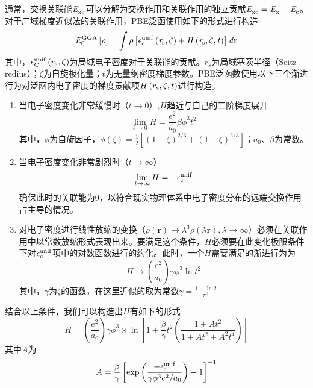 通常，交换关联能$\it E_{\rm xc}^{\rm } \it$可以分解为交换作用和关联作用的独立贡献\chinesecolon $\it E_{\rm xc}^{\rm } \it=\it E_{\rm x}^{\rm } \it+\it E_{\rm c}^{\rm } \it$。对于广域梯度近似法的关联作用，PBE泛函使用如下的形式进行构造\chinesecolon
\begin{equation}
    \it E_{\rm C}^{\rm GGA} \it\left[\rho\right]=\int \rho\left[\epsilon_{\rm c}^{\rm unif}\left(r_{\rm s},\zeta\right)+H\left(r_{\rm s},\zeta,t\right)\right] d{\mathbf r}
\end{equation}
其中，$\epsilon_{\rm C}^{\rm unif}\left(r_{\rm s},\zeta\right)$为局域电子密度对于关联能的贡献。$r_s$为局域塞茨半径（Seitz redius）；$\zeta$为自旋极化量；$t$为无量纲密度梯度参数。PBE泛函数使用以下三个渐进行为对泛函内电子密度的梯度贡献项$H\left(r_{\rm s},\zeta,t\right)$进行构造。

\begin{enumerate}
    \item 当电子密度变化非常缓慢时（$t\rightarrow 0$）,$H$趋近与自己的二阶梯度展开\chinesecolon
    \[
        \lim_{t\rightarrow0}H=\frac{e^2}{a_{0}}\beta\phi^3t^2
        \]
    其中，$\phi$为自旋因子，$\phi\left(\zeta\right)=\frac{1}{2}\left[\left(1+\zeta\right)^{2/ 3}+\left(1-\zeta\right)^{2/ 3}\right]$；$a_{0}$、$\beta$为常数。
    \item 当电子密度变化非常剧烈时（$t\rightarrow \infty$）
    \[
        \lim_{t\rightarrow\infty}H=-\epsilon_{\rm c}^{\rm unif}
    \]
    确保此时的关联能为0，以符合现实物理体系中电子密度分布的远端交换作用占主导的情况。
    \item 对电子密度进行线性放缩的变换（$\rho\left({\bm r}\right)\rightarrow \lambda^3\rho(\lambda {\bm r}), \lambda\rightarrow \infty$）必须在关联作用中以常数放缩形式表现出来。要满足这个条件，$H$必须要在此变化极限条件下对$\epsilon_{\rm c}^{\rm unif}$项中的对数函数进行的约化。此时，一个$H$需要满足的渐进行为为
    \[
        H\rightarrow\left(\frac{e^2}{a_0}\right)\gamma\phi^3\ln t^2
    \]
    其中，$\gamma$为$\zeta$的函数，在这里近似的取为常数$\gamma=\frac{1-\ln2}{\pi^2}$
\end{enumerate}

    结合以上条件，我们可以构造出$H$有如下的形式\chinesecolon
    \begin{equation}
        H=\left(\frac{e^2}{a_0}\right)\gamma\phi^3\times \ln\left[1+\frac{\beta}{\gamma}t^2\left(\frac{1+At^2}{1+At^2+A^2t^4}\right)\right]
    \end{equation}
    其中$A$为\chinesecolon
    \[
        A=\frac{\beta}{\gamma}\left[\exp\left(\frac{-\epsilon_{\rm c}^{\rm unif}}{\gamma\phi^3e^2/ a_0}\right)-1\right]^{-1}
    \]

